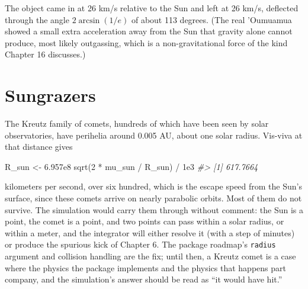 \documentclass[
  10.5pt,
  letterpaper,
]{scrbook}
\newenvironment{Shaded}{\begin{snugshade}}{\end{snugshade}}
\newcommand{\CommentTok}[1]{\textcolor[rgb]{0.00,0.00,0.00}{\textit{#1}}}
\newcommand{\DecValTok}[1]{\textcolor[rgb]{0.00,0.00,0.00}{#1}}
\newcommand{\FloatTok}[1]{\textcolor[rgb]{0.00,0.00,0.00}{#1}}
\newcommand{\FunctionTok}[1]{\textcolor[rgb]{0.00,0.00,0.00}{#1}}
\newcommand{\NormalTok}[1]{\textcolor[rgb]{0.00,0.00,0.00}{#1}}
\newcommand{\OtherTok}[1]{\textcolor[rgb]{0.00,0.00,0.00}{#1}}
\newcommand{\SpecialCharTok}[1]{\textcolor[rgb]{0.00,0.00,0.00}{#1}}
\newcommand{\StringTok}[1]{\textcolor[rgb]{0.00,0.00,0.00}{#1}}
\theoremstyle{plain}
\theoremstyle{remark}
\begin{document}
\begin{Shaded}
\end{Shaded}

The object came in at 26 km/s relative to the Sun and left at 26 km/s,
deflected through the angle \(2\arcsin(1/e)\) of about 113 degrees. (The
real 'Oumuamua showed a small extra acceleration away from the Sun that
gravity alone cannot produce, most likely outgassing, which is a
non-gravitational force of the kind Chapter 16 discusses.)

\section{Sungrazers}\label{sungrazers}

The Kreutz family of comets, hundreds of which have been seen by solar
observatories, have perihelia around 0.005 AU, about one solar radius.
Vis-viva at that distance gives

\begin{Shaded}
\begin{Highlighting}[]
\NormalTok{R\_sun }\OtherTok{\textless{}{-}} \FloatTok{6.957e8}
\FunctionTok{sqrt}\NormalTok{(}\DecValTok{2} \SpecialCharTok{*}\NormalTok{ mu\_sun }\SpecialCharTok{/}\NormalTok{ R\_sun) }\SpecialCharTok{/} \FloatTok{1e3}
\CommentTok{\#\textgreater{} [1] 617.7664}
\end{Highlighting}
\end{Shaded}

kilometers per second, over six hundred, which is the escape speed from
the Sun's surface, since these comets arrive on nearly parabolic orbits.
Most of them do not survive. The simulation would carry them through
without comment: the Sun is a point, the comet is a point, and two
points can pass within a solar radius, or within a meter, and the
integrator will either resolve it (with a step of minutes) or produce
the spurious kick of Chapter 6. The package roadmap's \texttt{radius}
argument and collision handling are the fix; until then, a Kreutz comet
is a case where the physics the package implements and the physics that
happens part company, and the simulation's answer should be read as ``it
would have hit.''
\end{document}
